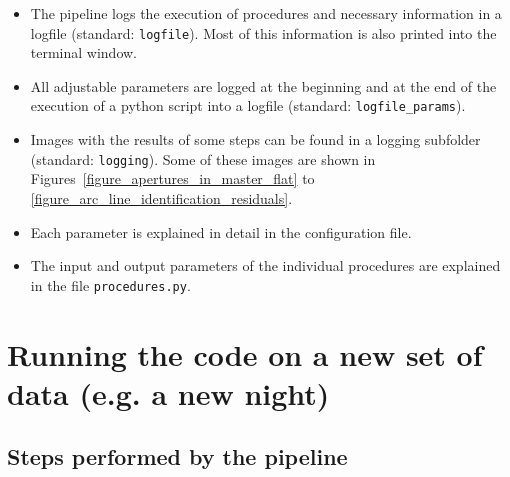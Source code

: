 \documentclass[10pt,a4paper]{article}
\begin{document}
\begin{itemize}
  \item The pipeline logs the execution of procedures and necessary information in a logfile (standard: \verb|logfile|). Most of this information is also printed into the terminal window.
  \item All adjustable parameters are logged at the beginning and at the end of the execution of a python script into a logfile (standard: \verb|logfile_params|).
  \item Images with the results of some steps can be found in a logging subfolder (standard: \verb|logging|). Some of these images are shown in Figures~\ref{figure_apertures_in_master_flat} to \ref{figure_arc_line_identification_residuals}.
  \item Each parameter is explained in detail in the configuration file.
  \item The input and output parameters of the individual procedures are explained in the file \verb|procedures.py|.
\end{itemize}





\newpage
\section{Running the code on a new set of data (e.g. a new night)}


\subsection{Steps performed by the pipeline}
\label{Section:pipeline_steps_general}
\end{document}
